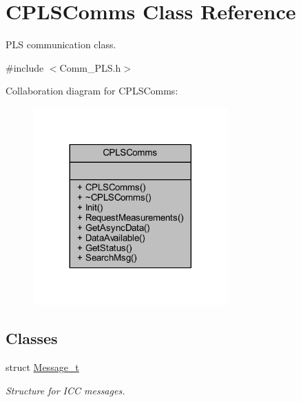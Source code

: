 \hypertarget{class_c_p_l_s_comms}{}\section{C\+P\+L\+S\+Comms Class Reference}
\label{class_c_p_l_s_comms}


P\+LS communication class.  




{\ttfamily \#include $<$Comm\+\_\+\+P\+L\+S.\+h$>$}



Collaboration diagram for C\+P\+L\+S\+Comms\+:\nopagebreak
\begin{figure}[H]
\begin{center}
\leavevmode
\includegraphics[width=212pt]{class_c_p_l_s_comms__coll__graph}
\end{center}
\end{figure}
\subsection*{Classes}
\begin{DoxyCompactItemize}
\item 
struct \mbox{\hyperlink{struct_c_p_l_s_comms_1_1_message__t}{Message\+\_\+t}}
\begin{DoxyCompactList}\small\item\em Structure for I\+CC messages. \end{DoxyCompactList}\end{DoxyCompactItemize}
